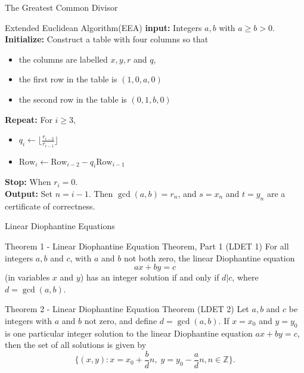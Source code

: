 \documentclass[11pt, aspectratio=169]{beamer}
\begin{document}
\begin{frame}{The Greatest Common Divisor}

\begin{block}{Extended Euclidean Algorithm(EEA)}
\textbf{input:} Integers $a, b$ with $a \ge b > 0$.\\
\textbf{Initialize:} Construct a table with four columns so that
\begin{itemize}
    \item the columns are labelled $x, y, r$ and $q$,
    \item the first row in the table is $(1, 0, a, 0)$
    \item the second row in the table is $(0,1,b,0)$
\end{itemize}
\textbf{Repeat:} For $i \ge 3$, 
\begin{itemize}
    \item $q_i \leftarrow \big \lfloor \frac{r_{i-2}}{r_{i-1}} \big \rfloor$
    \item $\text{Row}_i \leftarrow \text{Row}_{i-2} - q_i \text{Row}_{i-1}$
\end{itemize}
\textbf{Stop:} When $r_i = 0$.\\
\textbf{Output:} Set $n = i-1$. Then $\gcd(a,b) = r_n$, and $s = x_n$ and $t = y_n$ are a certificate of correctness.
\end{block}

\end{frame}





\begin{frame}{Linear Diophantine Equations}

\begin{block}{Theorem 1 - Linear Diophantine Equation Theorem, Part 1 (LDET 1)}
For all integers $a, b$ and $c$, with $a$ and $b$ not both zero, the linear Diophantine equation $$ax + by = c$$
(in variables $x$ and $y$) has an integer solution if and only if $d |c$, where $d = \gcd(a, b)$.
\end{block}

\begin{block}{Theorem 2 - Linear Diophantine Equation Theorem (LDET 2)}
Let $a, b$ and $c$ be integers with $a$ and $b$ not zero, and define $d = \gcd(a,b)$. If $x = x_0$ and $y = y_0$ is one particular integer solution to the linear Diophantine equation $ax + by = c$, then the set of all solutions is given by
$$\{(x, y): x = x_0 + \frac{b}{d}n, \; y=y_0 - \frac{a}{d}n, n \in \mathbb{Z}\}.$$
\end{block}

\end{frame}
\end{document}
